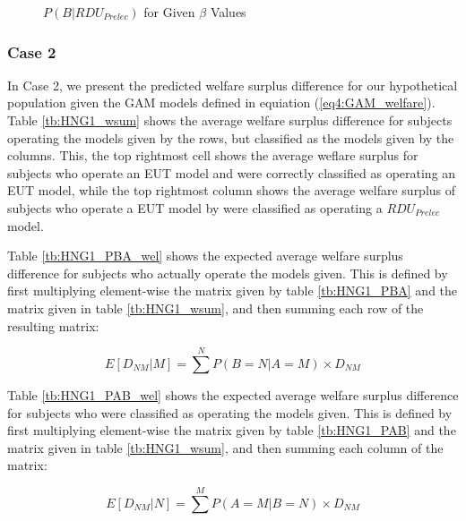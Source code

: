 \documentclass[../main.tex]{subfiles}
\begin{document}
\begin{figure}[hp!]
	\center
	\caption{$P(B|RDU_{Prelec})$ for Given $\beta$ Values}
	\label{fig:HNG1_EUT_PRE_welfare}
\end{figure}

\subsubsection{Case 2}

In Case 2, we present the predicted welfare surplus difference for our hypothetical population given the GAM models defined in equiation (\ref{eq4:GAM_welfare}).
Table \ref{tb:HNG1_wsum} shows the average welfare surplus difference for subjects operating the models given by the rows, but classified as the models given by the columns.
This, the top rightmost cell shows the average weflare surplus for subjects who operate an EUT model and were correctly classified as operating an EUT model, while the top rightmost column shows the average welfare surplus of subjects who operate a EUT model by were classified as operating a $\mathit{RDU_{Prelec}}$ model.

Table \ref{tb:HNG1_PBA_wel} shows the expected average welfare surplus difference for subjects who actually operate the models given.
This is defined by first multiplying element-wise the matrix given by table \ref{tb:HNG1_PBA} and the matrix given in table \ref{tb:HNG1_wsum}, and then summing each row of the resulting matrix:

\begin{equation}
	\label{eq4:PBA_wel}
	E [ D_{NM} | M ] = \sum^N P(B = N | A = M) \times D_{NM}
\end{equation}

Table \ref{tb:HNG1_PAB_wel} shows the expected average welfare surplus difference for subjects who were classified as operating the models given.
This is defined by first multiplying element-wise the matrix given by table \ref{tb:HNG1_PAB} and the matrix given in table \ref{tb:HNG1_wsum}, and then summing each column of the matrix:

\begin{equation}
	\label{eq4:PBA_wel}
	E [ D_{NM} | N ] = \sum^M P(A = M | B = N) \times D_{NM}
\end{equation}
\end{document}
